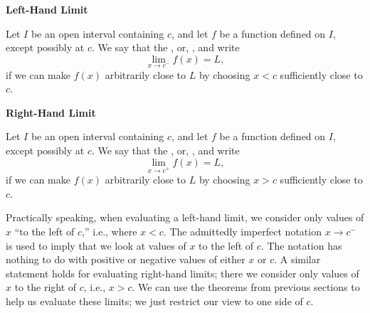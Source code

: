 %
\enlargethispage{1\baselineskip}
{\textbf{Left-Hand Limit} 

\indent Let $I$ be an open interval containing $c$, and let $f$ be a function defined on $I$, except possibly at $c$. 
We say that the , or, , and write  
\[
 \lim_{x\rightarrow c^-} f(x) = L,
\]
if we can make $f(x)$ arbitrarily close to $L$ by choosing $x<c$ sufficiently close to $c$.\\


\textbf{Right-Hand Limit}

Let $I$ be an open interval containing $c$, and let $f$ be a function defined on $I$, except possibly at $c$. 
We say that the , or, , and write  
\[
 \lim_{x\rightarrow c^+} f(x) = L,
\]
if we can make $f(x)$ arbitrarily close to $L$ by choosing $x>c$ sufficiently close to $c$.
}
\restoreboxwidth
\normalsize

Practically speaking, when evaluating a left-hand limit, we consider only values of $x$ ``to the left of $c$,'' i.e., where $x<c$. The admittedly imperfect notation $x\to c^-$ is used to imply that we look at values of $x$ to the left of $c$. The notation has nothing to do with positive or negative values of either $x$ or $c$. A similar statement holds for evaluating right-hand limits; there we consider only values of $x$ to the right of $c$, i.e., $x>c$. We can use the theorems from previous sections to help us evaluate these limits; we just restrict our view to one side of $c$.

